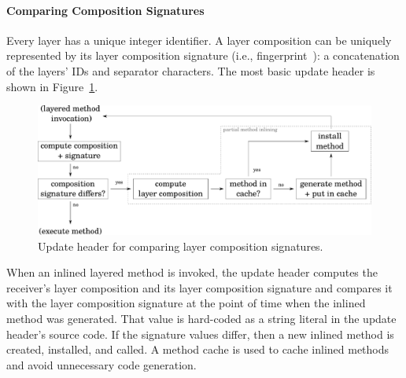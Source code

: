 \documentclass{sig-alternate}
\begin{document}
\paragraph{Comparing Composition Signatures}
Every layer has a unique integer identifier. A layer composition can be uniquely represented by its layer composition signature (i.e., fingerprint~\cite{Krahn:2012:ELA:2223947.2223971}): a concatenation of the layers' IDs and separator characters. The most basic update header is shown in Figure~\ref{fig:update_unoptimized}.

\begin{figure}[!htp]
    \centering
    \includegraphics[width=\columnwidth]{update_header_unoptimized.pdf}
    \caption{Update header for comparing layer composition signatures.}
    \label{fig:update_unoptimized}
\end{figure}

When an inlined layered method is invoked, the update header computes the receiver's layer composition and its layer composition signature and compares it with the layer composition signature at the point of time when the inlined method was generated. That value is hard-coded as a string literal in the update header's source code. If the signature values differ, then a new inlined method is created, installed, and called. A method cache is used to cache inlined methods and avoid unnecessary code generation.

\end{document}

